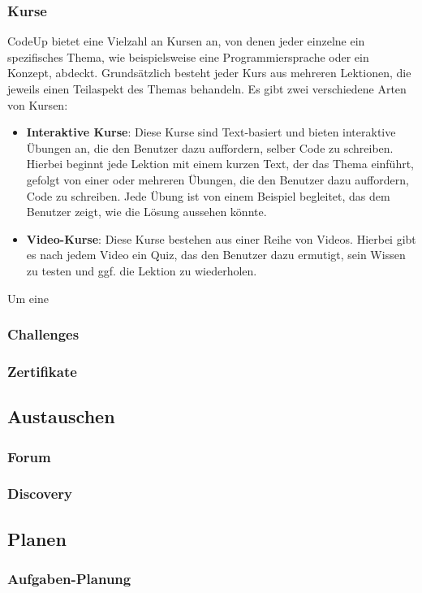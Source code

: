 \documentclass[main.tex]{subfiles}
\begin{document}
    \subsubsection{Kurse}
    CodeUp bietet eine Vielzahl an Kursen an, von denen jeder einzelne ein spezifisches Thema, wie beispielsweise eine Programmiersprache oder ein Konzept, abdeckt.
    Grundsätzlich besteht jeder Kurs aus mehreren Lektionen, die jeweils einen Teilaspekt des Themas behandeln.
    Es gibt zwei verschiedene Arten von Kursen:
    \begin{itemize}
        \item \textbf{Interaktive Kurse}: Diese Kurse sind Text-basiert und bieten interaktive Übungen an, die den Benutzer dazu auffordern, selber Code zu schreiben.
        Hierbei beginnt jede Lektion mit einem kurzen Text, der das Thema einführt, gefolgt von einer oder mehreren Übungen, die den Benutzer dazu auffordern, Code zu schreiben.
        Jede Übung ist von einem Beispiel begleitet, das dem Benutzer zeigt, wie die Lösung aussehen könnte.
        \item \textbf{Video-Kurse}: Diese Kurse bestehen aus einer Reihe von Videos.
        Hierbei gibt es nach jedem Video ein Quiz, das den Benutzer dazu ermutigt, sein Wissen zu testen und ggf. die Lektion zu wiederholen.
    \end{itemize}
    Um eine 
    \subsubsection{Challenges}
    \subsubsection{Zertifikate}
    \subsection{Austauschen}
    \subsubsection{Forum}
    \subsubsection{Discovery}
    \subsection{Planen}
    \subsubsection{Aufgaben-Planung}
\end{document}
